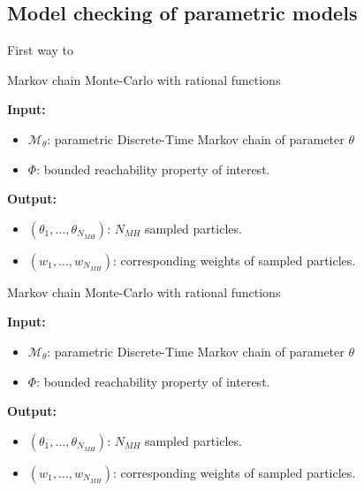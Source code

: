 \subsection{Model checking of parametric models}
First way to
\begin{algorithm}[H]
      \caption{Markov chain Monte-Carlo with rational functions}
      \label{rf-mcmc-alg}
      \hspace*{\algorithmicindent} \textbf{Input:}
      \begin{itemize}
            \item $\mathcal{M}_\theta$: parametric Discrete-Time Markov chain of parameter $\theta$
            \item $\Phi$: bounded reachability property of interest.
      \end{itemize}
      \hspace*{\algorithmicindent} \textbf{Output:}
      \begin{itemize}
            \item $(\theta_1,\ldots,\theta_{N_{MH}})$: $N_{MH}$ sampled particles.
            \item $(w_1,\ldots,w_{N_{MH}})$: corresponding weights of sampled particles.
      \end{itemize}
      \begin{algorithmic}[1]

            \EndProcedure
      \end{algorithmic}
\end{algorithm}


\begin{algorithm}[H]
      \caption{Markov chain Monte-Carlo with rational functions}
      \label{rf-mcmc-alg}
      \hspace*{\algorithmicindent} \textbf{Input:}
      \begin{itemize}
            \item $\mathcal{M}_\theta$: parametric Discrete-Time Markov chain of parameter $\theta$
            \item $\Phi$: bounded reachability property of interest.
      \end{itemize}
      \hspace*{\algorithmicindent} \textbf{Output:}
      \begin{itemize}
            \item $(\theta_1,\ldots,\theta_{N_{MH}})$: $N_{MH}$ sampled particles.
            \item $(w_1,\ldots,w_{N_{MH}})$: corresponding weights of sampled particles.
      \end{itemize}
      \begin{algorithmic}[1]
            \EndProcedure
      \end{algorithmic}
\end{algorithm}


